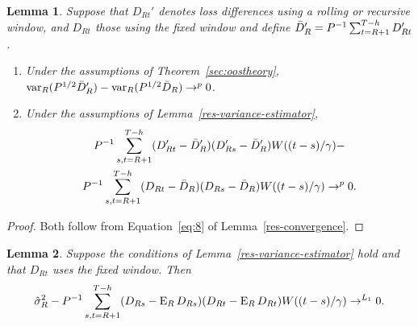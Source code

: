 \documentclass[11pt]{article}
\newtheorem{lem}{Lemma}
\begin{document}
\begin{lem}\label{lem:a3}
  Suppose that $D_{Rt}'$ denotes loss differences using a rolling or
  recursive window, and $D_{Rt}$ those using the fixed window and
  define $\bar{D}_{R}' = P^{-1} \sum_{t=R+1}^{T-h} D_{Rt}'$.  
  \begin{enumerate}
  \item Under the assumptions of Theorem~\ref{sec:oostheory},
    $\operatorname{var}_R(P^{1/2} \bar{D}_{R}') - \operatorname{var}_R(P^{1/2} \bar{D}_{R}) \to^p 0$.
  \item Under the assumptions of Lemma~\ref{res-variance-estimator},
    \begin{multline*}
      P^{-1} \sum_{s,t=R+1}^{T-h} (D_{Rt}' - \bar{D}_{R}') (D_{Rs}' -
      \bar{D}_{R}') W((t-s)/\gamma) - \\ P^{-1} \sum_{s,t=R+1}^{T-h}
      (D_{Rt} - \bar{D}_{R}) (D_{Rs} - \bar{D}_{R}) W((t-s)/\gamma) \to^p 0.
    \end{multline*}
  \end{enumerate}
\end{lem}
\begin{proof}
  Both follow from Equation~\eqref{eq:8} of Lemma~\ref{res-convergence}.
\end{proof}

\begin{lem}\label{lem:a6}
  Suppose the conditions of Lemma~\ref{res-variance-estimator} hold
  and that $D_{Rt}$ uses the fixed window.  Then
  \begin{equation*}
    \hat{\sigma}_R^2 - P^{-1} \sum_{s,t=R+1}^{T-h} (D_{Rs} - \operatorname{E}_R
    D_{Rs}) (D_{Rt} - \operatorname{E}_R D_{Rt}) W((t-s)/\gamma) \to^{L_1} 0.
  \end{equation*}
\end{lem}
\end{document}
